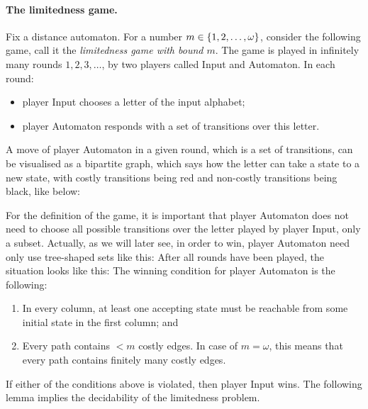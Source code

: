\paragraph*{The limitedness game.}
Fix a distance automaton. For a number $m \in \{1,2,\ldots, \omega\}$, consider the following game, call it the \emph{limitedness game with bound $m$}. The game is played in infinitely many rounds $1,2,3,\ldots$, by two players called Input and Automaton. In each round:
\begin{itemize}
	\item player Input chooses a letter of the input alphabet;
	\item player Automaton responds with a set of transitions over this letter.
\end{itemize}
A move of player Automaton in a given round, which is a set of transitions, can be visualised as a bipartite graph, which says how the letter can take a state to a new state, with costly transitions being red and non-costly transitions being black, like below:

For the definition of the game, it is important that player Automaton does not need to choose all possible transitions over the letter played by player Input, only a subset. Actually, as we will later see, in order to win, player Automaton need only use tree-shaped sets like this:
 After all rounds have been played, the situation looks like this:
The winning condition for player Automaton is the following:
\begin{enumerate}
	\item In every column, at least one accepting state must be reachable from some initial state in the first column; and
	\item Every path contains  $<m$ costly edges. In case of $m = \omega$, this means that every path contains finitely many costly edges.
\end{enumerate}

If either of the conditions above is violated, then player Input wins. The following lemma implies the decidability of the limitedness problem.


